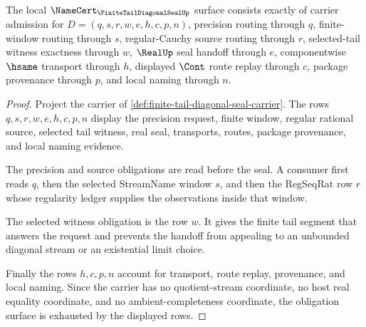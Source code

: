\begin{theorem}
\label{thm:finite-tail-diagonal-seal-namecert-obligations}
The local $\NameCert_{\FiniteTailDiagonalSealUp}$ surface consists exactly of carrier admission for $D=(q,s,r,w,e,h,c,p,n)$, precision routing through $q$, finite-window routing through $s$, regular-Cauchy source routing through $r$, selected-tail witness exactness through $w$, $\RealUp$ seal handoff through $e$, componentwise $\hsame$ transport through $h$, displayed $\Cont$ route replay through $c$, package provenance through $p$, and local naming through $n$.
\end{theorem}
\begin{proof}
Project the carrier of \autoref{def:finite-tail-diagonal-seal-carrier}. The rows $q,s,r,w,e,h,c,p,n$ display the precision request, finite window, regular rational source, selected tail witness, real seal, transports, routes, package provenance, and local naming evidence.

The precision and source obligations are read before the seal. A consumer first reads $q$, then the selected StreamName window $s$, and then the RegSeqRat row $r$ whose regularity ledger supplies the observations inside that window.

The selected witness obligation is the row $w$. It gives the finite tail segment that answers the request and prevents the handoff from appealing to an unbounded diagonal stream or an existential limit choice.

Finally the rows $h,c,p,n$ account for transport, route replay, provenance, and local naming. Since the carrier has no quotient-stream coordinate, no host real equality coordinate, and no ambient-completeness coordinate, the obligation surface is exhausted by the displayed rows.
\end{proof}

